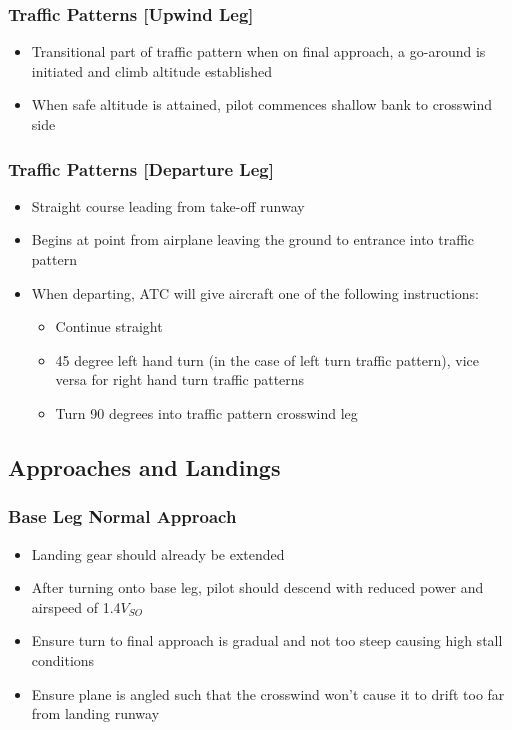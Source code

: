 \documentclass{article}
\begin{document}
\subsubsection*{Traffic Patterns [Upwind Leg]}

\begin{itemize}
\item Transitional part of traffic pattern when on final approach, a go-around is initiated and climb altitude established
\item When safe altitude is attained, pilot commences shallow bank to crosswind side
\end{itemize}

\subsubsection*{Traffic Patterns [Departure Leg]}

\begin{itemize}
\item Straight course leading from take-off runway
\item Begins at point from airplane leaving the ground to entrance into traffic pattern
\item When departing, ATC will give aircraft one of the following instructions:
\begin{itemize}
\item Continue straight
\item 45 degree left hand turn (in the case of left turn traffic pattern), vice versa for right hand turn traffic patterns
\item Turn 90 degrees into traffic pattern crosswind leg
\end{itemize}
\end{itemize}

\subsection{Approaches and Landings}

\subsubsection*{Base Leg Normal Approach}
\begin{itemize}
\item Landing gear should already be extended
\item After turning onto base leg, pilot should descend with reduced power and airspeed of 1.4$V_{SO}$
\item Ensure turn to final approach is gradual and not too steep causing high stall conditions
\item Ensure plane is angled such that the crosswind won't cause it to drift too far from landing runway
\end{itemize}
\end{document}
